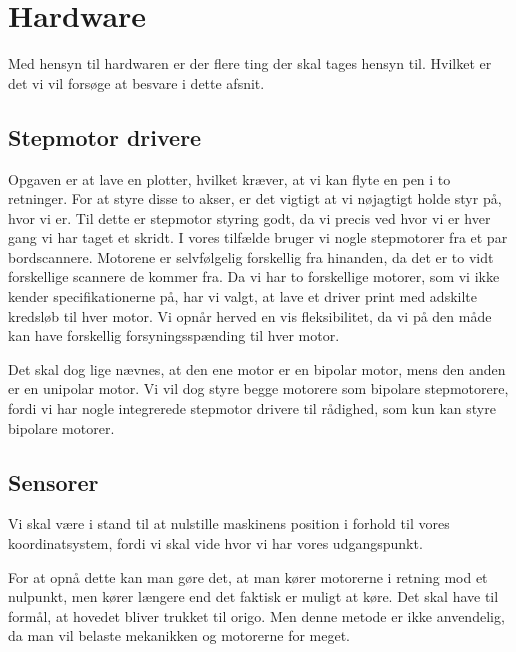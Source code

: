 \chapter[Design af hardware]{Hardware}
\label{ch:d-hardware}


Med hensyn til hardwaren er der flere ting der skal tages hensyn
til. Hvilket er det vi vil forsøge at besvare i dette afsnit.

\section{Stepmotor drivere}
Opgaven er at lave en plotter, hvilket kræver, at vi kan flyte en pen
i to retninger. For at styre disse to akser, er det vigtigt at vi
nøjagtigt holde styr på, hvor vi er. Til dette er stepmotor styring
godt, da vi precis ved hvor vi er hver gang vi har taget et skridt. I
vores tilfælde bruger vi nogle stepmotorer fra et par
bordscannere. Motorene er selvfølgelig forskellig fra hinanden, da det
er to vidt forskellige scannere de kommer fra. Da vi har to
forskellige motorer, som vi ikke kender specifikationerne på, har vi
valgt, at lave et driver print med adskilte kredsløb til hver
motor. Vi opnår herved en vis fleksibilitet, da vi på den måde kan
have forskellig forsyningsspænding til hver motor.

Det skal dog lige nævnes, at den ene motor er en bipolar motor, mens
den anden er en unipolar motor. Vi vil dog styre begge motorere som
bipolare stepmotorere, fordi vi har nogle integrerede stepmotor
drivere til rådighed, som kun kan styre bipolare motorer.

\section{Sensorer}
Vi skal være i stand til at nulstille maskinens position i forhold til
vores koordinatsystem, fordi vi skal vide hvor vi har vores
udgangspunkt.

For at opnå dette kan man gøre det, at man kører motorerne i retning
mod et nulpunkt, men kører længere end det faktisk er muligt at
køre. Det skal have til formål, at hovedet bliver trukket til
origo. Men denne metode er ikke anvendelig, da man vil belaste
mekanikken og motorerne for meget.

